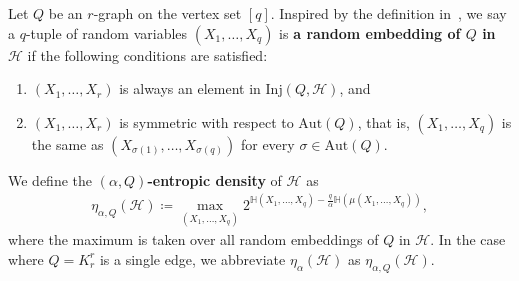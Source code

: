 \documentclass[11pt,a4paper]{article}
\begin{document}
Let $Q$ be an $r$-graph on the vertex set $[q]$. 
Inspired by the definition in~\cite{CY24}, we say a $q$-tuple of random variables $(X_1, \ldots, X_{q})$ is \textbf{a random embedding of $Q$ in $\mathcal{H}$} if the following conditions are satisfied:
\begin{enumerate}[label=(\roman*)]
    \item\label{prop:random-embedding-a} $(X_1, \ldots, X_{r})$ is always an element in $\mathrm{Inj}(Q,\mathcal{H})$, and 
    \item\label{prop:random-embedding-b} $(X_1, \ldots, X_{r})$ is symmetric with respect to $\mathrm{Aut}(Q)$, that is, $(X_1, \ldots, X_{q})$ is the same as $(X_{\sigma(1)}, \ldots, X_{\sigma(q)})$ for every $\sigma \in \mathrm{Aut}(Q)$. 
\end{enumerate}
%
We define the \textbf{$(\alpha,Q)$-entropic density} of $\mathcal{H}$ as 
\begin{align*}
    \eta_{\alpha,Q}(\mathcal{H})
    \coloneqq \max_{(X_1, \ldots, X_{q})} 2^{\mathbb{H}(X_1, \ldots, X_{q}) - \frac{q}{\alpha} \mathbb{H}\left( \mu(X_1, \ldots, X_q) \right)}, 
\end{align*}
where the maximum is taken over all random embeddings of $Q$ in $\mathcal{H}$.
In the case where $Q = K_{r}^{r}$ is a single edge, we abbreviate $\eta_{\alpha}(\mathcal{H})$ as $\eta_{\alpha,Q}(\mathcal{H})$.
\end{document}
